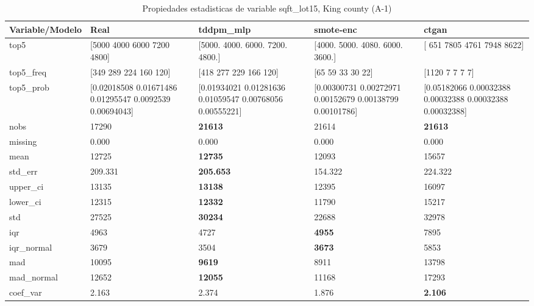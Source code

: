 \begin{table}[H]
\centering
\fontsize{8}{14}\selectfont
\caption{Propiedades  estadisticas de variable sqft\_lot15, King county (A-1)}
\label{table-stats-king county-a-1-sqft_lot15}
\begin{tabular}{|l|m{10em}|m{10em}|m{10em}|m{10em}|}
\hline
 \rowcolor[gray]{0.8}
Variable/Modelo & Real & tddpm\_mlp & smote-enc & ctgan \\
\hline top5 & [5000 4000 6000 7200 4800] & [5000. 4000. 6000. 7200. 4800.] & [4000. 5000. 4080. 6000. 3600.] & [ 651 7805 4761 7948 8622] \\
\hline top5\_freq & [349 289 224 160 120] & [418 277 229 166 120] & [65 59 33 30 22] & [1120    7    7    7    7] \\
\hline top5\_prob & [0.02018508 0.01671486 0.01295547 0.0092539  0.00694043] & [0.01934021 0.01281636 0.01059547 0.00768056 0.00555221] & [0.00300731 0.00272971 0.00152679 0.00138799 0.00101786] & [0.05182066 0.00032388 0.00032388 0.00032388 0.00032388] \\
\hline nobs & 17290 & \bfseries 21613 & \cellcolor[rgb]{0.9, 0.54, 0.52} 21614 & \bfseries 21613 \\
\hline missing & 0.000 & 0.000 & 0.000 & 0.000 \\
\hline mean & 12725 & \bfseries 12735 & 12093 & \cellcolor[rgb]{0.9, 0.54, 0.52} 15657 \\
\hline std\_err & 209.331 & \bfseries 205.653 & \cellcolor[rgb]{0.9, 0.54, 0.52} 154.322 & 224.322 \\
\hline upper\_ci & 13135 & \bfseries 13138 & 12395 & \cellcolor[rgb]{0.9, 0.54, 0.52} 16097 \\
\hline lower\_ci & 12315 & \bfseries 12332 & 11790 & \cellcolor[rgb]{0.9, 0.54, 0.52} 15217 \\
\hline std & 27525 & \bfseries 30234 & 22688 & \cellcolor[rgb]{0.9, 0.54, 0.52} 32978 \\
\hline iqr & 4963 & 4727 & \bfseries 4955 & \cellcolor[rgb]{0.9, 0.54, 0.52} 7895 \\
\hline iqr\_normal & 3679 & 3504 & \bfseries 3673 & \cellcolor[rgb]{0.9, 0.54, 0.52} 5853 \\
\hline mad & 10095 & \bfseries 9619 & 8911 & \cellcolor[rgb]{0.9, 0.54, 0.52} 13798 \\
\hline mad\_normal & 12652 & \bfseries 12055 & 11168 & \cellcolor[rgb]{0.9, 0.54, 0.52} 17293 \\
\hline coef\_var & 2.163 & 2.374 & \cellcolor[rgb]{0.9, 0.54, 0.52} 1.876 & \bfseries 2.106 \\

\end{tabular}
\end{table}
